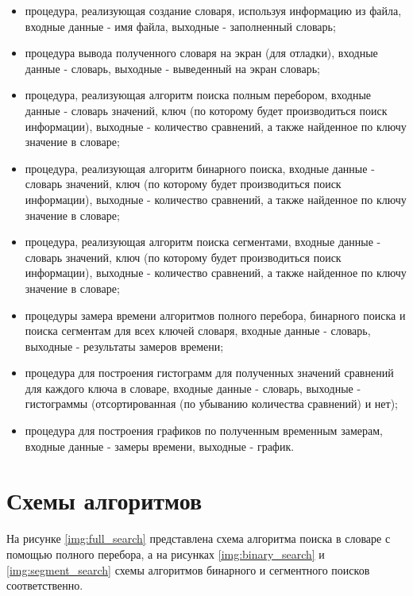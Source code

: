 \begin{itemize}
	\item процедура, реализующая создание словаря, используя информацию из файла, входные данные - имя файла, выходные - заполненный словарь;
	\item процедура вывода полученного словаря на экран (для отладки), входные данные - словарь, выходные - выведенный на экран словарь;
	\item процедура, реализующая алгоритм поиска полным перебором, входные данные - словарь значений, ключ (по которому будет производиться поиск информации), выходные - количество сравнений, а также найденное по ключу значение в словаре;
	\item процедура, реализующая алгоритм бинарного поиска, входные данные - словарь значений, ключ (по которому будет производиться поиск информации), выходные - количество сравнений, а также найденное по ключу значение в словаре;
	\item процедура, реализующая алгоритм поиска сегментами, входные данные - словарь значений, ключ (по которому будет производиться поиск информации), выходные - количество сравнений, а также найденное по ключу значение в словаре;
	\item процедуры замера времени алгоритмов полного перебора, бинарного поиска и поиска сегментам для всех ключей словаря, входные данные - словарь, выходные - результаты замеров времени;
	\item процедура для построения гистограмм для полученных значений сравнений для каждого ключа в словаре, входные данные - словарь, выходные - гистограммы (отсортированная (по убыванию количества сравнений) и нет); 
	\item процедура для построения графиков по полученным временным замерам, входные данные - замеры времени, выходные - график. 
\end{itemize}


\section{Схемы алгоритмов}
На рисунке \ref{img:full_search} представлена схема алгоритма поиска в словаре с помощью полного перебора, а на рисунках \ref{img:binary_search} и \ref{img:segment_search} схемы алгоритмов бинарного и сегментного поисков соответственно.


